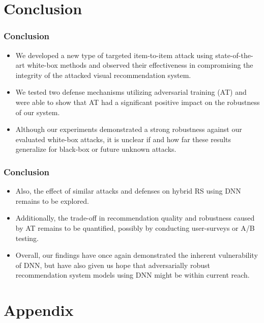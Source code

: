 \documentclass{beamer}
\begin{document}
	\section{Conclusion}
	\begin{frame}
		\frametitle{Conclusion}
		\begin{itemize}
			\item We developed a new type of targeted item-to-item attack using state-of-the-art white-box methods and observed their effectiveness in compromising the integrity of the attacked visual recommendation system. 
			
			\item We tested two defense mechanisms utilizing adversarial training (AT) and were able to show that AT had a significant positive impact on the robustness of our system.
			
			\item Although our experiments demonstrated a strong robustness against our evaluated white-box attacks, it is unclear if and how far these results generalize for black-box or future unknown attacks.
		\end{itemize}
	\end{frame}
	
	\begin{frame}
		\frametitle{Conclusion}
		\begin{itemize}
			\item Also, the effect of similar attacks and defenses on hybrid RS using DNN remains to be explored.
			
			\item Additionally, the trade-off in recommendation quality and robustness caused by AT remains to be quantified, possibly by conducting user-surveys or A/B testing.
			
			\item Overall, our findings have once again demonstrated the inherent vulnerability of DNN, but have also given us hope that adversarially robust recommendation system models using DNN might be within current reach.
		\end{itemize}
	\end{frame}
	
	\section{Appendix}
	
\end{document}
